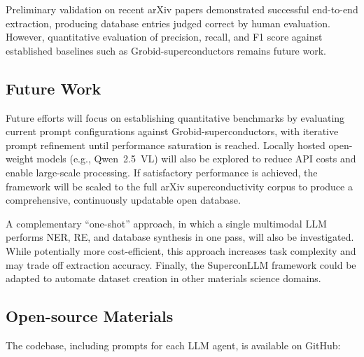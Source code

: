 Preliminary validation on recent arXiv papers demonstrated successful end-to-end extraction, producing database entries judged correct by human evaluation. However, quantitative evaluation of precision, recall, and F1 score against established baselines such as Grobid-superconductors \cite{Foppiano2023} remains future work.

\subsection*{Future Work}
Future efforts will focus on establishing quantitative benchmarks by evaluating current prompt configurations against Grobid-superconductors, with iterative prompt refinement until performance saturation is reached. Locally hosted open-weight models (e.g., Qwen~2.5~VL) will also be explored to reduce API costs and enable large-scale processing. If satisfactory performance is achieved, the framework will be scaled to the full arXiv superconductivity corpus to produce a comprehensive, continuously updatable open database.

A complementary ``one-shot'' approach, in which a single multimodal LLM performs NER, RE, and database synthesis in one pass, will also be investigated. While potentially more cost-efficient, this approach increases task complexity and may trade off extraction accuracy. Finally, the SuperconLLM framework could be adapted to automate dataset creation in other materials science domains.

\subsection*{Open-source Materials}
The codebase, including prompts for each LLM agent, is available on GitHub: 







